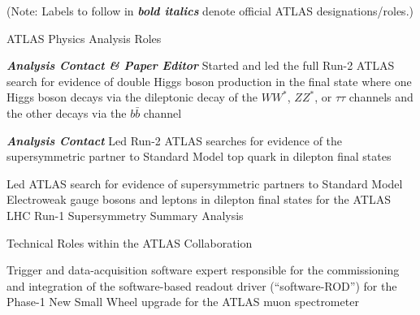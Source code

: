 \hspace{0.45in}
\begin{minipage}{0.8\textwidth}

(Note: Labels to follow in \textbf{\textit{bold italics}} denote official ATLAS designations/roles.)
\vspace{0.15in}

ATLAS Physics Analysis Roles
\vspace{0.1in}

\hspace{0.2in}
\begin{minipage}{\textwidth}
\textbf{\textit{Analysis Contact \& Paper Editor}} Started and led the full Run-2 ATLAS search for evidence of double Higgs boson
    production in the final state where one Higgs boson decays via the dileptonic decay of the
    $WW^*$, $ZZ^*$, or $\tau \tau$ channels and the other decays via the $b\bar{b}$ channel%
\end{minipage}

\vspace{0.1in}
\hspace{0.2in}
\begin{minipage}{\textwidth}
\textbf{\textit{Analysis Contact}} Led Run-2 ATLAS searches for evidence of the supersymmetric partner
    to Standard Model top quark in dilepton final states%
\end{minipage}

\vspace{0.1in}
\hspace{0.2in}
\begin{minipage}{\textwidth}
Led ATLAS search for evidence of supersymmetric partners to Standard Model Electroweak
gauge bosons and leptons in dilepton final states for the ATLAS LHC Run-1 Supersymmetry Summary Analysis%
\end{minipage}

\vspace{0.15in}
Technical Roles within the ATLAS Collaboration

\vspace{0.15in}
\hspace{0.2in}
\begin{minipage}{\textwidth}
Trigger and data-acquisition software expert responsible for the commissioning and integration
of the software-based readout driver (``software-ROD'') for the Phase-1 New Small Wheel upgrade for the
ATLAS muon spectrometer
\end{minipage}


\end{minipage}
